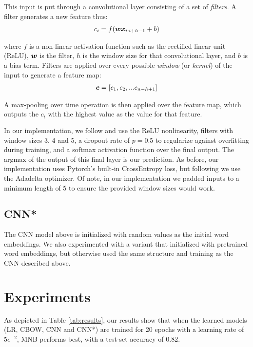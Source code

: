 \documentclass[11pt]{article}
\begin{document}
This input is put through a convolutional layer consisting of a set of \textit{filters}. A filter generates a new feature thus:
\begin{align}
  c_i = f(\boldsymbol{w}\boldsymbol{x}_{i:i+h-1} + b)
\end{align}

where $f$ is a non-linear activation function such as the rectified linear unit (ReLU), $\boldsymbol{w}$ is the filter, $h$ is the window size for that convolutional layer, and $b$ is a bias term. Filters are applied over every possible \textit{window} (or \textit{kernel}) of the input to generate a feature map:
\begin{align}
  \boldsymbol{c} = [c_1, c_2, ... c_{n-h+1}]
\end{align}

A max-pooling over time operation is then applied over the feature map, which outputs the $c_i$ with the highest value as the value for that feature.

In our implementation, we follow \cite{kim2014convolutional} and use the ReLU nonlinearity, filters with window sizes 3, 4 and 5, a dropout rate of $p=0.5$ to regularize against overfitting during training, and a softmax activation function over the final output. The argmax of the output of this final layer is our prediction. As before, our implementation uses Pytorch's built-in CrossEntropy loss, but following \cite{kim2014convolutional} we use the Adadelta optimizer. Of note, in our implementation we padded inputs to a minimum length of 5 to ensure the provided window sizes would work.

\subsection{CNN*}

The CNN model above is initialized with random values as the initial word embeddings. We also experimented with a variant that initialized with pretrained word embeddings, but otherwise used the same structure and training as the CNN described above. 

\section{Experiments}

As depicted in Table \ref{tab:results}, our results show that when the learned models (LR, CBOW, CNN and CNN*) are trained for 20 epochs with a learning rate of $5e^{-2}$, MNB performs best, with a test-set accuracy of 0.82.
\end{document}

